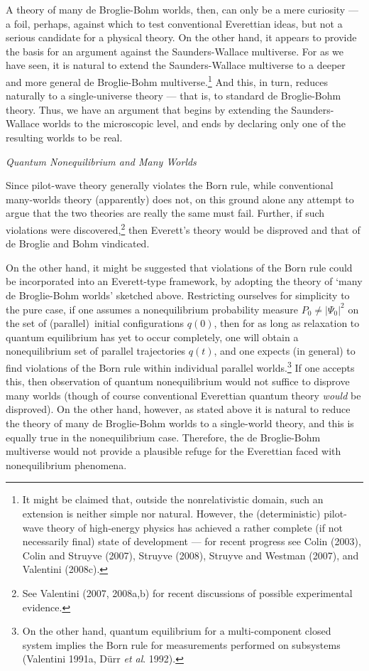 \documentclass{article}%
\begin{document}
A theory of many de Broglie-Bohm worlds, then, can only be a mere curiosity
--- a foil, perhaps, against which to test conventional Everettian ideas, but
not a serious candidate for a physical theory. On the other hand, it appears
to provide the basis for an argument against the Saunders-Wallace multiverse.
For as we have seen, it is natural to extend the Saunders-Wallace multiverse
to a deeper and more general de Broglie-Bohm multiverse.\footnote{It might be
claimed that, outside the nonrelativistic domain, such an extension is neither
simple nor natural. However, the (deterministic) pilot-wave theory of
high-energy physics has achieved a rather complete (if not necessarily final)
state of development --- for recent progress see Colin (2003), Colin and
Struyve (2007), Struyve (2008), Struyve and Westman (2007), and Valentini
(2008c).} And this, in turn, reduces naturally to a single-universe theory ---
that is, to standard de Broglie-Bohm theory. Thus, we have an argument that
begins by extending the Saunders-Wallace worlds to the microscopic level, and
ends by declaring only one of the resulting worlds to be real.

\begin{center}
\textit{Quantum Nonequilibrium and Many Worlds}
\end{center}

Since pilot-wave theory generally violates the Born rule, while conventional
many-worlds theory (apparently) does not, on this ground alone any attempt to
argue that the two theories are really the same must fail. Further, if such
violations were discovered,\footnote{See Valentini (2007, 2008a,b) for recent
discussions of possible experimental evidence.} then Everett's theory would be
disproved and that of de Broglie and Bohm vindicated.

On the other hand, it might be suggested that violations of the Born rule
could be incorporated into an Everett-type framework, by adopting the theory
of `many de Broglie-Bohm worlds' sketched above. Restricting ourselves for
simplicity to the pure case, if one assumes a nonequilibrium probability
measure $P_{0}\neq|\Psi_{0}|^{2}$ on the set of (parallel)\ initial
configurations $q(0)$, then for as long as relaxation to quantum equilibrium
has yet to occur completely, one will obtain a nonequilibrium set of parallel
trajectories $q(t)$, and one expects (in general) to find violations of the
Born rule within individual parallel worlds.\footnote{On the other hand,
quantum equilibrium for a multi-component closed system implies the Born rule
for measurements performed on subsystems (Valentini 1991a, D\"{u}rr \textit{et
al}. 1992).} If one accepts this, then observation of quantum nonequilibrium
would not suffice to disprove many worlds (though of course conventional
Everettian quantum theory \textit{would} be disproved). On the other hand,
however, as stated above it is natural to reduce the theory of many de
Broglie-Bohm worlds to a single-world theory, and this is equally true in the
nonequilibrium case. Therefore, the de Broglie-Bohm multiverse would not
provide a plausible refuge for the Everettian faced with nonequilibrium phenomena.
\end{document}

